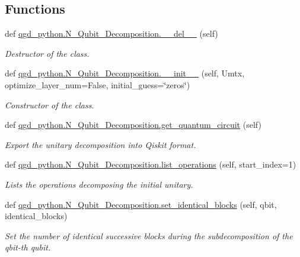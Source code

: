 \subsection*{Functions}
\begin{DoxyCompactItemize}
\item 
def \hyperlink{group__python_gaeba96037339a2173be32f9da54b2b640}{qgd\+\_\+python.\+N\+\_\+\+Qubit\+\_\+\+Decomposition.\+\_\+\+\_\+del\+\_\+\+\_\+} (self)
\begin{DoxyCompactList}\small\item\em Destructor of the class. \end{DoxyCompactList}\item 
def \hyperlink{group__python_gaa61a063ce130eec9f91483ea366c4875}{qgd\+\_\+python.\+N\+\_\+\+Qubit\+\_\+\+Decomposition.\+\_\+\+\_\+init\+\_\+\+\_\+} (self, Umtx, optimize\+\_\+layer\+\_\+num=False, initial\+\_\+guess=\char`\"{}zeros\char`\"{})
\begin{DoxyCompactList}\small\item\em Constructor of the class. \end{DoxyCompactList}\item 
def \hyperlink{group__python_ga7f84dd22a6748be01c990c734e95c23d}{qgd\+\_\+python.\+N\+\_\+\+Qubit\+\_\+\+Decomposition.\+get\+\_\+quantum\+\_\+circuit} (self)
\begin{DoxyCompactList}\small\item\em Export the unitary decomposition into Qiskit format. \end{DoxyCompactList}\item 
def \hyperlink{group__python_ga90a4aa2757be84217c83aad59a5baf60}{qgd\+\_\+python.\+N\+\_\+\+Qubit\+\_\+\+Decomposition.\+list\+\_\+operations} (self, start\+\_\+index=1)
\begin{DoxyCompactList}\small\item\em Lists the operations decomposing the initial unitary. \end{DoxyCompactList}\item 
def \hyperlink{group__python_ga0b1a2119452bd55192ed3e49450030aa}{qgd\+\_\+python.\+N\+\_\+\+Qubit\+\_\+\+Decomposition.\+set\+\_\+identical\+\_\+blocks} (self, qbit, identical\+\_\+blocks)
\begin{DoxyCompactList}\small\item\em Set the number of identical successive blocks during the subdecomposition of the qbit-\/th qubit. \end{DoxyCompactList}\item 

\end{DoxyCompactItemize}

